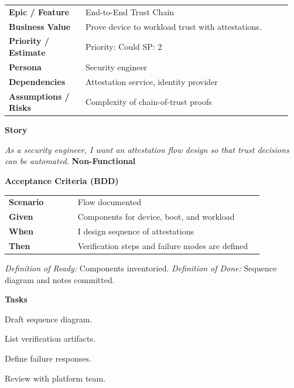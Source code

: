 \documentclass[11pt,letterpaper]{article}
\makeatletter
\newenvironment{kvtable}{%
  \begin{tabular}{@{}>{\bfseries\arraybackslash}p{0.26\linewidth} p{0.70\linewidth}@{}}
}{\end{tabular}}
\newenvironment{bdd}{%
  \begin{tabular}{@{}>{\bfseries\arraybackslash}p{0.26\linewidth} p{0.70\linewidth}@{}}
}{\end{tabular}}
\newcommand{\DoRDoD}[2]{%
  \vspace{0.35em}
  {\footnotesize\color{Muted}%
    \textit{Definition of Ready:} #1 \; \textbullet\;
    \textit{Definition of Done:} #2%
  }%
}
\newenvironment{storycard}[2]{%
  \begin{tcolorbox}[cloudcard, title={#1 --- #2}]%
}{\end{tcolorbox}}
\newcommand{\sectionlabel}[1]{\vspace{0.35em}\textbf{#1}\par}
\makeatother
\begin{document}
\begin{storycard}{CCS-26}{Ch. 26 — Trusted Computing Proposals}
\begin{kvtable}
Epic / Feature & End-to-End Trust Chain\\
Business Value & Prove device to workload trust with attestations.\\
Priority / Estimate & Priority: Could \quad SP: 2\\
Persona & Security engineer\\
Dependencies & Attestation service, identity provider\\
Assumptions / Risks & Complexity of chain-of-trust proofs\\
\end{kvtable}
\sectionlabel{Story}
\textit{As a security engineer, I want an attestation flow design so that trust decisions can be automated.}
\sectionlabel{Non-Functional}\;
\sectionlabel{Acceptance Criteria (BDD)}
\begin{bdd}
Scenario & Flow documented\\
Given & Components for device, boot, and workload\\
When & I design sequence of attestations\\
Then & Verification steps and failure modes are defined\\
\end{bdd}
\DoRDoD{Components inventoried.}{Sequence diagram and notes committed.}
\sectionlabel{Tasks}
\begin{checklist}
\item Draft sequence diagram.
\item List verification artifacts.
\item Define failure responses.
\item Review with platform team.
\end{checklist}
\end{storycard}
\end{document}
